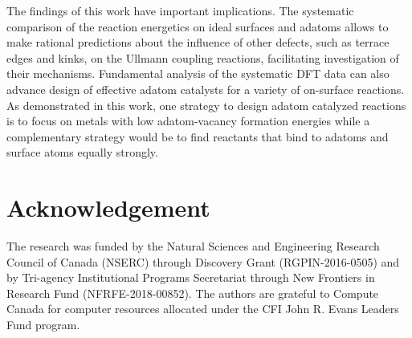 \documentclass[aps,prb,amsmath,amssymb,11pt]{revtex4-1}
\newcommand*{\ACSNANO}{}
\begin{document}

The findings of this work have important implications. The systematic comparison of the reaction energetics on ideal surfaces and adatoms allows to make rational predictions about the influence of other defects, such as terrace edges and kinks, on the Ullmann coupling reactions, facilitating investigation of their mechanisms.
Fundamental analysis of the systematic DFT data can also advance design of effective adatom catalysts for a variety of on-surface reactions. As demonstrated in this work, one strategy to design adatom catalyzed reactions is to focus on metals with low adatom-vacancy formation energies while a complementary strategy would be to find reactants that bind to adatoms and surface atoms equally strongly. 


\ifdefined\ACSNANO



\fi

\section*{Acknowledgement}

The research was funded by the Natural Sciences and Engineering Research Council of Canada (NSERC) through Discovery Grant (RGPIN-2016-0505) and by Tri-agency Institutional Programs Secretariat through New Frontiers in Research Fund (NFRFE-2018-00852). The authors are grateful to Compute Canada for computer resources allocated under the CFI John R. Evans Leaders Fund program.
\end{document}

